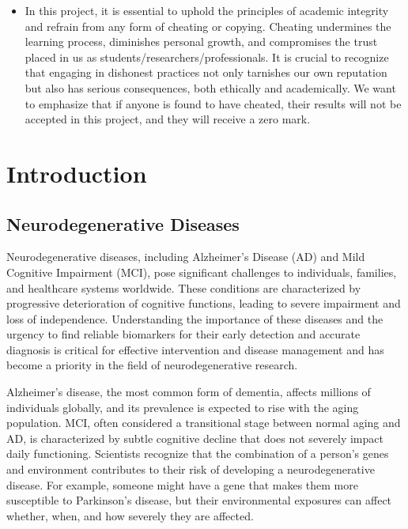\documentclass[12pt]{article}
\begin{document}
\begin{itemize}
	\item In this project, it is essential to uphold the principles of academic integrity and refrain from any form of cheating or copying. Cheating undermines the learning process, diminishes personal growth, and compromises the trust placed in us as students/researchers/professionals. It is crucial to recognize that engaging in dishonest practices not only tarnishes our own reputation but also has serious consequences, both ethically and academically. We want to emphasize that if anyone is found to have cheated, their results will not be accepted in this project, and they will receive a zero mark.

\end{itemize}
\newpage

\tableofcontents

\newpage


\section{Introduction}
\subsection{Neurodegenerative Diseases} Neurodegenerative diseases, including Alzheimer's Disease (AD) and Mild Cognitive Impairment (MCI), pose significant challenges to individuals, families, and healthcare systems worldwide. These conditions are characterized by progressive deterioration of cognitive functions, leading to severe impairment and loss of independence. Understanding the importance of these diseases and the urgency to find reliable biomarkers for their early detection and accurate diagnosis is critical for effective intervention and disease management and has become a priority in the field of neurodegenerative research. \par
Alzheimer's disease, the most common form of dementia, affects millions of individuals globally, and its prevalence is expected to rise with the aging population. MCI, often considered a transitional stage between normal aging and AD, is characterized by subtle cognitive decline that does not severely impact daily functioning.
Scientists recognize that the combination of a person’s genes and environment contributes to their risk of developing a neurodegenerative disease. For example, someone might have a gene that makes them more susceptible to Parkinson’s disease, but their environmental exposures can affect whether, when, and how severely they are affected. \cite{ref-nih}
\end{document}
